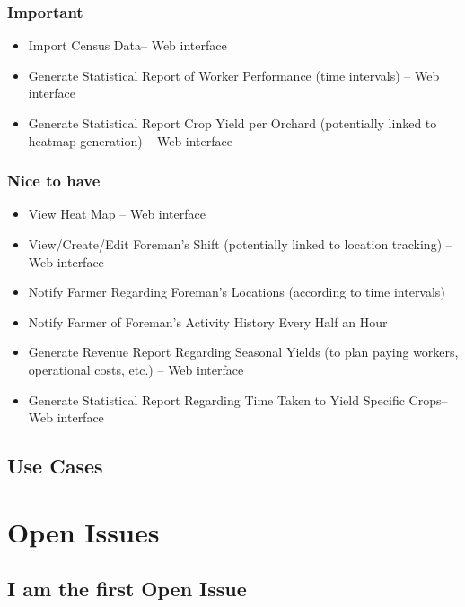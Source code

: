 \documentclass[11pt,fleqn]{book} %
\begin{document}
		\subsection{Important}
			\begin{itemize}
				\item Import Census Data– Web interface
				\item Generate Statistical Report of Worker Performance (time intervals) – Web interface
				\item Generate Statistical Report Crop Yield per Orchard (potentially linked to heatmap generation) – Web interface				
			\end{itemize}		
		
		\subsection{Nice to have}
			\begin{itemize}
				\item View Heat Map – Web interface
				\item View/Create/Edit Foreman’s Shift (potentially linked to location tracking)  – Web interface
				\item Notify Farmer Regarding Foreman’s Locations (according to time intervals)
				\item Notify Farmer of Foreman’s Activity History Every Half an Hour
				\item Generate Revenue Report Regarding Seasonal Yields (to plan paying workers, operational costs, etc.) – Web interface
				\item Generate Statistical Report Regarding Time Taken to Yield Specific Crops– Web interface
				
			\end{itemize}
	\section{Use Cases}
	
	


\chapter{Open Issues}

\section{I am the first Open Issue}
\end{document}
